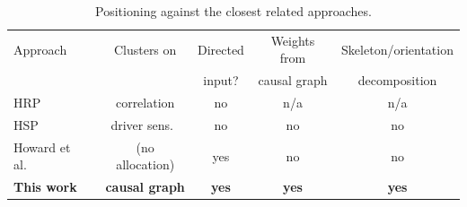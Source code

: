 \begin{table}[t]
  \centering
  \caption{Positioning against the closest related approaches.}
  \label{tab:gap}
  \begin{tabular}{l c c c c}
    \toprule
    Approach & Clusters on & Directed & Weights from & Skeleton/orientation \\
             &             & input?   & causal graph & decomposition \\
    \midrule
    HRP \cite{lopezdeprado2016hrp}         & correlation      & no  & n/a & n/a \\
    HSP \cite{rodriguez2023hsp}            & driver sens.\    & no  & no  & no \\
    Howard et al.\ \cite{howard2025causal} & (no allocation)  & yes & no  & no \\
    \textbf{This work}                     & \textbf{causal graph} & \textbf{yes} & \textbf{yes} & \textbf{yes} \\
    \bottomrule
  \end{tabular}
\end{table}
